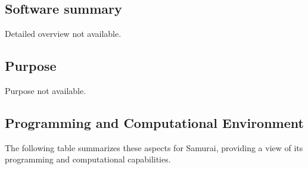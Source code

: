 \subsection{Software summary}
\label{sec:Samurai:summary}
Detailed overview not available.



\subsection{Purpose}
\label{sec:Samurai:purpose}
Purpose not available.

\subsection{Programming and Computational Environment}
\label{sec::Samurai:environment_capabilities}


The following table summarizes these aspects for Samurai, providing a  view of its programming and computational capabilities.

